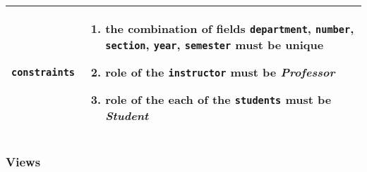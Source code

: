 \begin{table}[H]
\begin{tabular}[H]{r|p{4in}}
        \texttt{constraints} & 
            \vspace{-7mm}
            \begin{enumerate}[leftmargin=5mm, itemsep=0em, parsep=0em]
                \item the combination of fields \texttt{department},
                        \texttt{number},
                        \hspace{2em}\texttt{section},
                        \texttt{year},
                        \texttt{semester} must be unique
                \item role of the \texttt{instructor} must be \emph{Professor}
                \item role of the each of the \texttt{students} must be
                        \emph{Student}
            \end{enumerate} \vspace{-9mm}\\
        \hline
    \end{tabular}
    \renewcommand{\arraystretch}{1}
    
\end{table}

\subsubsection{Views}


